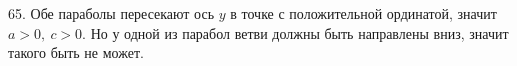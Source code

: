 65. Обе параболы пересекают ось $y$ в точке с положительной ординатой, значит $a>0,\ c>0.$ Но у одной из парабол ветви должны быть направлены вниз, значит такого быть не может.\\
